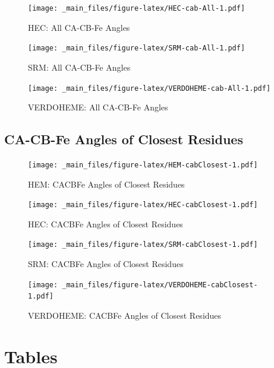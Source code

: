 \documentclass[a4paper, nobind]{templates/ociamthesis}
\begin{document}
\begin{figure}
\centering
\texttt{[image: \_main\_files/figure-latex/HEC-cab-All-1.pdf]}
\caption{\label{fig:HEC-cab-All}HEC: All CA-CB-Fe Angles}
\end{figure}

\begin{figure}
\centering
\texttt{[image: \_main\_files/figure-latex/SRM-cab-All-1.pdf]}
\caption{\label{fig:SRM-cab-All}SRM: All CA-CB-Fe Angles}
\end{figure}

\begin{figure}
\centering
\texttt{[image: \_main\_files/figure-latex/VERDOHEME-cab-All-1.pdf]}
\caption{\label{fig:VERDOHEME-cab-All}VERDOHEME: All CA-CB-Fe Angles}
\end{figure}

\hypertarget{figs-cabClosest}{%
\section{CA-CB-Fe Angles of Closest Residues}\label{figs-cabClosest}}

\begin{figure}
\centering
\texttt{[image: \_main\_files/figure-latex/HEM-cabClosest-1.pdf]}
\caption{\label{fig:HEM-cabClosest}HEM: CACBFe Angles of Closest Residues}
\end{figure}

\begin{figure}
\centering
\texttt{[image: \_main\_files/figure-latex/HEC-cabClosest-1.pdf]}
\caption{\label{fig:HEC-cabClosest}HEC: CACBFe Angles of Closest Residues}
\end{figure}

\begin{figure}
\centering
\texttt{[image: \_main\_files/figure-latex/SRM-cabClosest-1.pdf]}
\caption{\label{fig:SRM-cabClosest}SRM: CACBFe Angles of Closest Residues}
\end{figure}

\begin{figure}
\centering
\texttt{[image: \_main\_files/figure-latex/VERDOHEME-cabClosest-1.pdf]}
\caption{\label{fig:VERDOHEME-cabClosest}VERDOHEME: CACBFe Angles of Closest Residues}
\end{figure}

\hypertarget{a-tables}{%
\chapter{Tables}\label{a-tables}}
\end{document}
